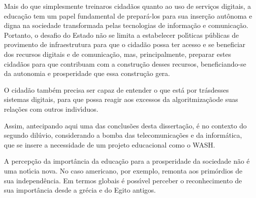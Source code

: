 \documentclass[
12pt,		%
openright,	%
twoside,  %
a4paper,			%
chapter=TITLE,		%
english,			%
french,				%
spanish,			%
brazil				%
]{USPSC-classe/USPSC}
\begin{document}
Mais do que simplesmente \textquotedbl treinar\textquotedbl  os cidad\~aos quanto ao uso  de servi\c{c}os digitais, a educa\c{c}\~ao tem um papel fundamental de prepar\'a-los para sua inser\c{c}\~ao aut\^onoma e digna na sociedade transformada pelas tecnologias de informa\c{c}\~ao e comunica\c{c}\~ao. Portanto, o desafio do Estado n\~ao se limita a estabelecer pol\'{\i}ticas p\'ublicas de provimento de infraestrutura para que o cidad\~ao possa ter acesso e se beneficiar dos recursos digitais e de comunica\c{c}\~ao, mas, principalmente, preparar estes cidad\~aos para que contribuam com a  constru\c{c}\~ao desses recursos, beneficiando-se da autonomia e prosperidade que  essa constru\c{c}\~ao gera.









O cidad\~ao tamb\'em precisa ser capaz de entender \textquotedbl o que est\'a por tr\'as\textquotedbl  desses sistemas digitais, para que possa reagir aos excessos da \textquotedbl algoritmiza\c{c}\~ao\textquotedbl  de suas rela\c{c}\~oes com outros indiv\'{\i}duos.









Assim, antecipando aqui uma das conclus\~oes desta disserta\c{c}\~ao, \'e no contexto do \textquotedbl segundo dil\'uvio\textquotedbl , considerando a bomba das telecomunica\c{c}\~oes e da inform\'atica, que se insere a necessidade de um projeto educacional como o WASH.









A percep\c{c}\~ao da import\^ancia da educa\c{c}\~ao para a prosperidade da sociedade n\~ao \'e uma not\'{\i}cia nova. No caso americano, por exemplo, remonta aos prim\'ordios de sua independ\^encia. Em termos globais \'e poss\'{\i}vel perceber o reconhecimento de sua import\^ancia desde a gr\'ecia e do Egito antigos.
\end{document}
